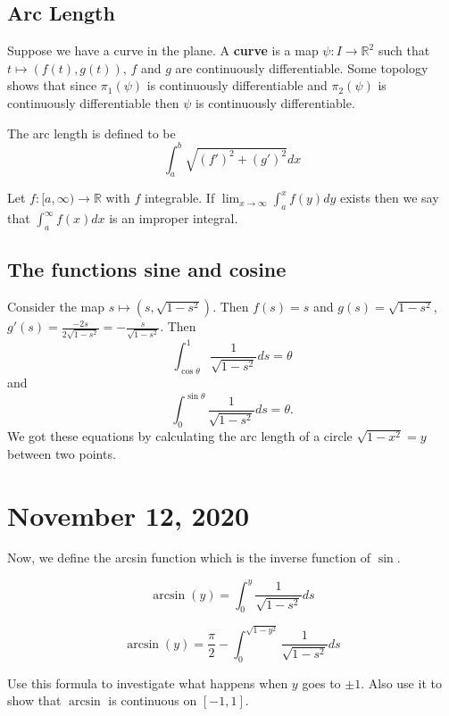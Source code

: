 \documentclass{article}
\newcommand{\vocab}[1]{\textbf{\color{blue!90}\boldmath #1}}
\newcommand{\R}{\mathbb{R}}
\newcommand{\ra}[1][]{\xrightarrow{#1}}
\begin{document}
\subsection{Arc Length}
Suppose we have a curve in the plane. A \vocab{curve} is a map $\psi:I\ra \R^2$ such that $t\mapsto (f(t),g(t))$, $f$ and $g$ are continuously differentiable. Some topology shows that since $\pi_1(\psi)$ is continuously differentiable and $\pi_2(\psi)$ is continuously differentiable then $\psi$ is continuously differentiable.
\begin{definition}
The arc length is defined to be $$\int_a^b \sqrt{(f')^2+(g')^2}dx$$
\end{definition}
\begin{definition}
Let $f:[a,\infty)\ra\R$ with $f$ integrable. If $\lim_{x\ra\infty}\int_a^xf(y)dy$ exists then we say that $\int_a^\infty f(x)dx$ is an improper integral.
\end{definition}
\subsection{The functions sine and cosine}
Consider the map $s\mapsto (s,\sqrt{1-s^2})$. Then $f(s)=s$ and $g(s)=\sqrt{1-s^2}$, $g'(s)=\frac{-2s}{2\sqrt{1-s^2}}=-\frac{s}{\sqrt{1-s^2}}$. Then $$\int_{\cos\theta}^1\frac{1}{\sqrt{1-s^2}}ds=\theta$$ and
$$\int_0^{\sin\theta}\frac{1}{\sqrt{1-s^2}}ds=\theta.$$
We got these equations by calculating the arc length of a circle $\sqrt{1-x^2}=y$ between two points.
\section{November 12, 2020}
Now, we define the arcsin function which is the inverse function of $\sin$.

$$\arcsin(y)=\int_0^y\frac{1}{\sqrt{1-s^2}}ds$$

$$\arcsin(y)=\frac{\pi}{2}-\int_0^{\sqrt{1-y^2}}\frac{1}{\sqrt{1-s^2}}ds$$

Use this formula to investigate what happens when $y$ goes to $\pm 1$. Also use it to show that $\arcsin$ is continuous on $[-1,1]$.
\end{document}
